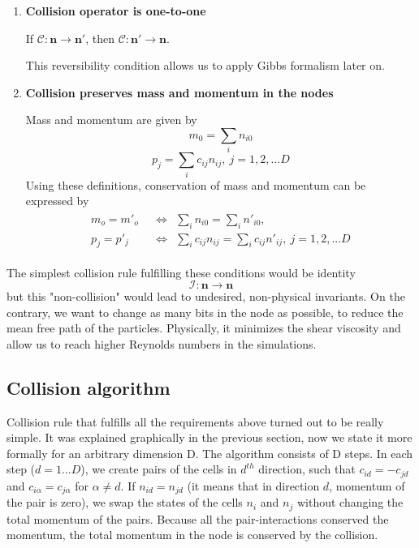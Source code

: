 \begin{enumerate}
\item \textbf{Collision operator is one-to-one}

If $\mathcal{C}: \bm{n} \rightarrow \bm{n'}$,
then $\mathcal{C}: \bm{n'} \rightarrow \bm{n}$.

This reversibility condition allows us to apply Gibbs formalism later on.

\item \textbf{Collision preserves mass and momentum in the nodes}

Mass and momentum are given by
\begin{equation}
m_0 = \sum_i n_{i0}
\end{equation}
\begin{equation}
p_j = \sum_i c_{ij} n_{ij},~j=1,2,...D
\end{equation}
Using these definitions, conservation of mass and momentum can be expressed by
\begin{align}\label{mmc}
\begin{split} 
m_o = m'_o &~~ \Leftrightarrow ~~ \sum_i n_{i0} = \sum_i n'_{i0}, \\
p_j = p'_j &~~ \Leftrightarrow ~~ \sum_i c_{ij} n_{ij} = \sum_i c_{ij} n'_{ij}, ~j=1,2,... D 
\end{split}
\end{align}
\end{enumerate}
The simplest collision rule fulfilling these conditions would be identity
\begin{equation}
\mathcal{I}:\bm{n} \rightarrow \bm{n}
\end{equation}
but this "non-collision" would lead to undesired, non-physical invariants.
On the contrary, we want to change as many bits in the node as possible, to reduce the mean free path of the particles. Physically, it minimizes the shear viscosity and allow us to reach higher Reynolds numbers in the simulations.

\subsection{Collision algorithm}
Collision rule that fulfills all the requirements above turned out to be really simple. It was explained graphically in the previous section, now we state it more formally for an arbitrary dimension D.
The algorithm consists of D steps.
In each step ($d=1...D$), we create pairs of the cells in $d^{th}$ direction, such that $c_{id} = -c_{jd}$ and $c_{i\alpha} = c_{j\alpha}$ for $\alpha \neq d$.
If $n_{id} = n_{jd}$ (it means that in direction $d$, momentum of the pair is zero), we swap the states of the cells $n_i$ and $n_j$ without changing the total momentum of the pairs.
Because all the pair-interactions conserved the momentum, the total momentum in the node is conserved by the collision.

